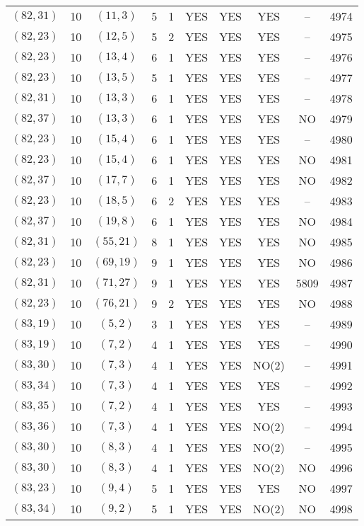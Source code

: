 \begin{longtable}{|c|c|c|c|c|c|c|c|c|c|}
$(82, 31)$ & 10 & $(11, 3)$ & 5 & 1 & YES & YES & YES & -- & 4974\\
$(82, 23)$ & 10 & $(12, 5)$ & 5 & 2 & YES & YES & YES & -- & 4975\\
$(82, 23)$ & 10 & $(13, 4)$ & 6 & 1 & YES & YES & YES & -- & 4976\\
$(82, 23)$ & 10 & $(13, 5)$ & 5 & 1 & YES & YES & YES & -- & 4977\\
$(82, 31)$ & 10 & $(13, 3)$ & 6 & 1 & YES & YES & YES & -- & 4978\\
$(82, 37)$ & 10 & $(13, 3)$ & 6 & 1 & YES & YES & YES & NO & 4979\\
$(82, 23)$ & 10 & $(15, 4)$ & 6 & 1 & YES & YES & YES & -- & 4980\\
$(82, 23)$ & 10 & $(15, 4)$ & 6 & 1 & YES & YES & YES & NO & 4981\\
$(82, 37)$ & 10 & $(17, 7)$ & 6 & 1 & YES & YES & YES & NO & 4982\\
$(82, 23)$ & 10 & $(18, 5)$ & 6 & 2 & YES & YES & YES & -- & 4983\\
$(82, 37)$ & 10 & $(19, 8)$ & 6 & 1 & YES & YES & YES & NO & 4984\\
$(82, 31)$ & 10 & $(55, 21)$ & 8 & 1 & YES & YES & YES & NO & 4985\\
$(82, 23)$ & 10 & $(69, 19)$ & 9 & 1 & YES & YES & YES & NO & 4986\\
$(82, 31)$ & 10 & $(71, 27)$ & 9 & 1 & YES & YES & YES & 5809 & 4987\\
$(82, 23)$ & 10 & $(76, 21)$ & 9 & 2 & YES & YES & YES & NO & 4988\\
$(83, 19)$ & 10 & $(5, 2)$ & 3 & 1 & YES & YES & YES & -- & 4989\\
$(83, 19)$ & 10 & $(7, 2)$ & 4 & 1 & YES & YES & YES & -- & 4990\\
$(83, 30)$ & 10 & $(7, 3)$ & 4 & 1 & YES & YES & NO(2) & -- & 4991\\
$(83, 34)$ & 10 & $(7, 3)$ & 4 & 1 & YES & YES & YES & -- & 4992\\
$(83, 35)$ & 10 & $(7, 2)$ & 4 & 1 & YES & YES & YES & -- & 4993\\
$(83, 36)$ & 10 & $(7, 3)$ & 4 & 1 & YES & YES & NO(2) & -- & 4994\\
$(83, 30)$ & 10 & $(8, 3)$ & 4 & 1 & YES & YES & NO(2) & -- & 4995\\
$(83, 30)$ & 10 & $(8, 3)$ & 4 & 1 & YES & YES & NO(2) & NO & 4996\\
$(83, 23)$ & 10 & $(9, 4)$ & 5 & 1 & YES & YES & YES & NO & 4997\\
$(83, 34)$ & 10 & $(9, 2)$ & 5 & 1 & YES & YES & NO(2) & NO & 4998\\

\end{longtable}
